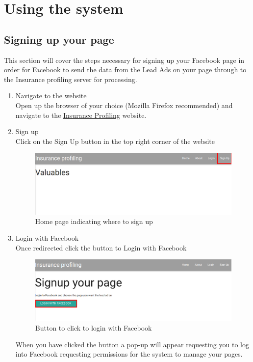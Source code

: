 \documentclass{article}
\begin{document}
	\section{Using the system}
		\subsection{Signing up your page}
			This section will cover the steps necessary for signing up your Facebook page in order for Facebook to send the data from the Lead Ads on your page through to the Insurance profiling server for processing.
			\begin{enumerate}
				\item Navigate to the website\\
				Open up the browser of your choice (Mozilla Firefox recommended) and navigate to the \href{https://insuranceprofiling.herokuapp.com}{Insurance Profiling} website.

				\item Sign up\\
				Click on the Sign Up button in the top right corner of the website\\
				\begin{figure}[H]
				  \centering
				      \includegraphics[width=\textwidth]{images/home_signup.png}
				  \caption{Home page indicating where to sign up}
				  \label{fig:homeSignup}
				\end{figure}

				\item Login with Facebook\\
				Once redirected click the button to Login with Facebook\\
				\begin{figure}[H]
				  \centering
				      \includegraphics[width=\textwidth]{images/signup_login.png}
				  \caption{Button to click to login with Facebook}
				  \label{fig:signupLogin}
				\end{figure}
				When you have clicked the button a pop-up will appear requesting you to log into Facebook requesting permissions for the system to manage your pages.


\end{enumerate}
\end{document}
